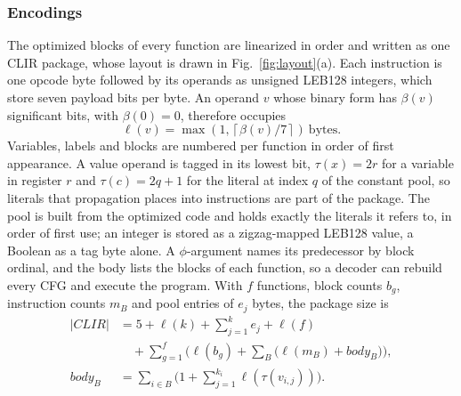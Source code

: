 \documentclass{ieeeaccess}
\newcommand{\clir}{CLIR}
\begin{document}
\subsubsection{Encodings}
The optimized blocks of every function are linearized in order and written as one \clir{} package, whose layout is drawn in Fig.~\ref{fig:layout}(a). Each instruction is one opcode byte followed by its operands as unsigned LEB128 integers, which store seven payload bits per byte. An operand $v$ whose binary form has $\beta(v)$ significant bits, with $\beta(0)=0$, therefore occupies
\begin{equation}
\ell(v)=\max\!\left(1,\left\lceil \beta(v)/7\right\rceil\right)\ \text{bytes}.
\label{eq:leb}
\end{equation}
Variables, labels and blocks are numbered per function in order of first appearance. A value operand is tagged in its lowest bit, $\tau(x)=2r$ for a variable in register $r$ and $\tau(c)=2q+1$ for the literal at index $q$ of the constant pool, so literals that propagation places into instructions are part of the package. The pool is built from the optimized code and holds exactly the literals it refers to, in order of first use; an integer is stored as a zigzag-mapped LEB128 value, a Boolean as a tag byte alone. A $\phi$-argument names its predecessor by block ordinal, and the body lists the blocks of each function, so a decoder can rebuild every CFG and execute the program. With $f$ functions, block counts $b_g$, instruction counts $m_B$ and pool entries of $e_j$ bytes, the package size is
\begin{equation}
\begin{aligned}
|\clir{}| &= 5+\ell(k)+\textstyle\sum_{j=1}^{k} e_j+\ell(f)\\
&\quad+\textstyle\sum_{g=1}^{f}\Big(\ell(b_g)+\sum_{B}\big(\ell(m_B)+\mathit{body}_B\big)\Big),\\
\mathit{body}_B &= \textstyle\sum_{i\in B}\Big(1+\sum_{j=1}^{k_i}\ell(\tau(v_{i,j}))\Big).
\end{aligned}
\label{eq:clir}
\end{equation}
\end{document}
